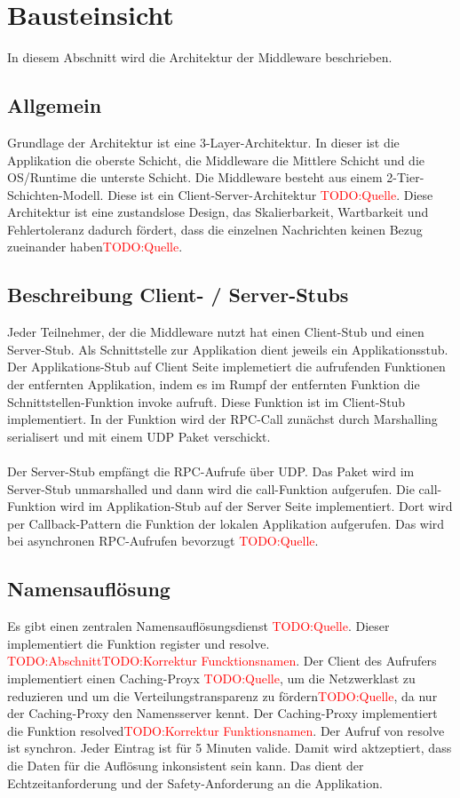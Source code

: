 \chapter{Bausteinsicht}
In diesem Abschnitt wird die Architektur der Middleware beschrieben.

\section{Allgemein}
Grundlage der Architektur ist eine 3-Layer-Architektur. In dieser ist die Applikation die oberste Schicht, die Middleware die Mittlere Schicht und die OS/Runtime die unterste Schicht. Die Middleware besteht aus einem 2-Tier-Schichten-Modell. Diese ist ein Client-Server-Architektur \textcolor{red}{TODO:Quelle}. Diese Architektur ist eine zustandslose Design, das Skalierbarkeit, Wartbarkeit und Fehlertoleranz dadurch  fördert, dass die einzelnen Nachrichten keinen Bezug zueinander haben\textcolor{red}{TODO:Quelle}.

\section{Beschreibung Client- / Server-Stubs}
Jeder Teilnehmer, der die Middleware nutzt hat einen Client-Stub und einen Server-Stub. Als Schnittstelle zur Applikation dient jeweils ein Applikationsstub. Der Applikations-Stub auf Client Seite implemetiert die aufrufenden Funktionen der entfernten Applikation, indem es im Rumpf der entfernten Funktion die Schnittstellen-Funktion \glqq{}invoke\grqq{} aufruft. Diese Funktion ist im Client-Stub implementiert. In der Funktion wird der RPC-Call zunächst durch Marshalling serialisert und mit einem UDP Paket verschickt.\\\\
Der Server-Stub empfängt die RPC-Aufrufe über UDP. Das Paket wird im Server-Stub unmarshalled und dann wird die \glqq{}call\grqq{}-Funktion aufgerufen. Die \glqq{}call\grqq{}-Funktion wird im Applikation-Stub auf der Server Seite implementiert. Dort wird per Callback-Pattern die Funktion der lokalen Applikation aufgerufen. Das wird bei asynchronen RPC-Aufrufen bevorzugt \textcolor{red}{TODO:Quelle}.

\section{Namensauflösung}
Es gibt einen zentralen Namensauflösungsdienst \textcolor{red}{TODO:Quelle}. Dieser implementiert die Funktion \glqq{}register\grqq{} und \glqq{}resolve\grqq{}. \textcolor{red}{TODO:Abschnitt}\textcolor{red}{TODO:Korrektur Funcktionsnamen}. Der Client des Aufrufers implementiert einen Caching-Proyx \textcolor{red}{TODO:Quelle}, um die Netzwerklast zu reduzieren und um die Verteilungstransparenz zu fördern\textcolor{red}{TODO:Quelle}, da nur der Caching-Proxy den Namensserver kennt. Der Caching-Proxy implementiert die Funktion \glqq{}resolved\grqq{}\textcolor{red}{TODO:Korrektur Funktionsnamen}. Der Aufruf von \glqq{}resolve\grqq{} ist synchron. Jeder Eintrag ist für 5 Minuten valide. Damit wird aktzeptiert, dass die Daten für die Auflösung inkonsistent sein kann. Das dient der Echtzeitanforderung und der Safety-Anforderung an die Applikation.

